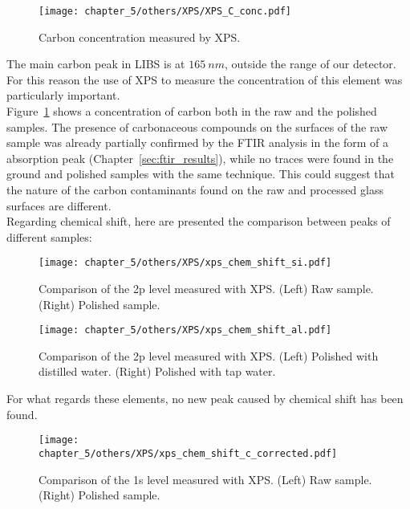 \begin{figure}[H]
   \centering
   \texttt{[image: chapter\_5/others/XPS/XPS\_C\_conc.pdf]} 
   \vspace*{-30pt}
   \caption{Carbon concentration measured by XPS. }
   \label{fig:c_xps}
\end{figure}
The main carbon peak in LIBS is at $165 \: nm$, outside the range of our detector. For this reason the use of XPS to measure the concentration of this element was particularly important.
\\
Figure~\ref{fig:c_xps} shows a concentration of carbon both in the raw and the polished samples. The presence of carbonaceous compounds on the surfaces of the raw sample was already partially confirmed by the FTIR analysis in the form of a  absorption peak (Chapter~\ref{sec:ftir_results}), while no traces were found in the ground and polished samples with the same technique. This could suggest that the nature of the carbon contaminants found on the raw and processed glass surfaces are different.
\\
Regarding chemical shift, here are presented the comparison between peaks of different samples:

\begin{figure}[H]
   \centering
   \texttt{[image: chapter\_5/others/XPS/xps\_chem\_shift\_si.pdf]} 
   \vspace*{-30pt}
   \caption{Comparison of the 2p level measured with XPS. (Left) Raw sample. (Right) Polished sample.}
   \label{fig:xps_shift_si}
\end{figure}

\begin{figure}[H]
   \centering
   \texttt{[image: chapter\_5/others/XPS/xps\_chem\_shift\_al.pdf]} 
   \vspace*{-30pt}
   \caption{Comparison of the 2p level measured with XPS. (Left) Polished with distilled water. (Right) Polished with tap water.}
   \label{fig:xps_shift_al}
\end{figure}

For what regards these elements, no new peak caused by chemical shift has been found.


\begin{figure}[H]
   \centering
   \texttt{[image: chapter\_5/others/XPS/xps\_chem\_shift\_c\_corrected.pdf]} 
   \vspace*{-30pt}
   \caption{Comparison of the 1s level measured with XPS. (Left) Raw sample. (Right) Polished sample.}
   \label{fig:xps_shift_c}
\end{figure}

